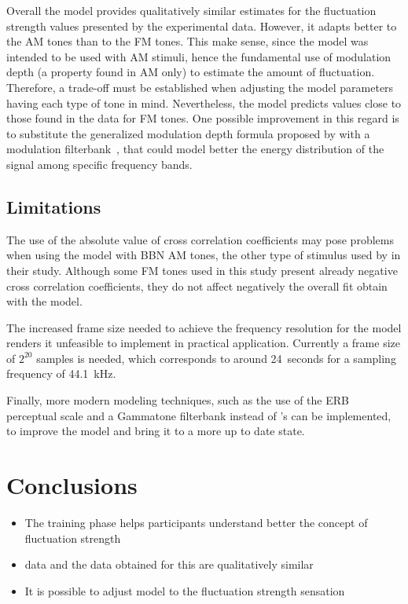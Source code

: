 \documentclass[../main.tex]{subfiles}
\begin{document}
Overall the model provides qualitatively similar estimates for the fluctuation
strength values presented by the experimental data. However, it adapts better to
the \gls{AM} tones than to the \gls{FM} tones. This make sense, since the model
was intended to be used with \gls{AM} stimuli, hence the fundamental use of
modulation depth (a property found in \gls{AM} only) to estimate the amount of
fluctuation. Therefore, a trade-off must be established when adjusting the model
parameters having each type of tone in mind. Nevertheless, the model predicts
values close to those found in the data for \gls{FM} tones. One possible
improvement in this regard is to substitute the generalized modulation depth
formula proposed by \citeauthor{daniel1997psychoacoustical} with a modulation
filterbank~\cite{Dau1997}, that could model better the energy distribution of
the signal among specific frequency bands.

\subsection{Limitations}

The use of the absolute value of cross correlation coefficients may pose
problems when using the model with \gls{BBN} \gls{AM} tones, the other type
of stimulus used by \citeauthor{Fastl2007Psychoacoustics} in their study.
Although some \gls{FM} tones used in this study present already negative cross
correlation coefficients, they do not affect negatively the overall fit obtain
with the model.

The increased frame size needed to achieve the frequency resolution for the
model renders it unfeasible to implement in practical application. Currently
a frame size of $2^{20}$ samples is needed, which corresponds to around
24~seconds for a sampling frequency of 44.1~kHz.

Finally, more modern modeling techniques, such as the use of the ERB perceptual
scale and a Gammatone filterbank instead of \citeauthor{Terhardt1979}'s can be
implemented, to improve the model and bring it to a more up to date state.

\section{Conclusions}

\begin{itemize}
  \item The training phase helps participants understand better the concept of
    fluctuation strength
  \item \citeauthor{Fastl2007Psychoacoustics} data and the data obtained for
    this are qualitatively similar
  \item It is possible to adjust \citeauthor{daniel1997psychoacoustical} model
    to the fluctuation strength sensation
\end{itemize}
\end{document}
